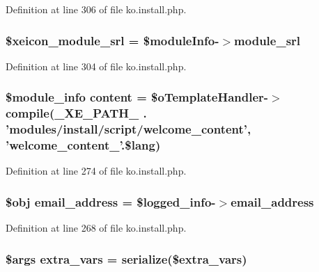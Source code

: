 Definition at line 306 of file ko.\-install.\-php.

\hypertarget{ko_8install_8php_acf278a9931e1d1ea52b045c0fa42b9b3}{
\subsubsection[{\$xeicon\-\_\-module\-\_\-srl}]{\setlength{\rightskip}{0pt plus 5cm}\$xeicon\-\_\-module\-\_\-srl = \$module\-Info-\/$>${\bf module\-\_\-srl}}}\label{ko_8install_8php_acf278a9931e1d1ea52b045c0fa42b9b3}


Definition at line 304 of file ko.\-install.\-php.

\hypertarget{ko_8install_8php_a65dddc3e5e47cb506e6b5417ffb3bdef}{
\subsubsection[{content}]{\setlength{\rightskip}{0pt plus 5cm}\$module\-\_\-info {\bf content} = \$o\-Template\-Handler-\/$>$compile({\bf \-\_\-\-X\-E\-\_\-\-P\-A\-T\-H\-\_\-} . 'modules/{\bf install}/script/welcome\-\_\-content', 'welcome\-\_\-content\-\_\-'.\$lang)}}\label{ko_8install_8php_a65dddc3e5e47cb506e6b5417ffb3bdef}


Definition at line 274 of file ko.\-install.\-php.

\hypertarget{ko_8install_8php_a1dffea0d5ba8194f8ef01f414af0c831}{
\subsubsection[{email\-\_\-address}]{\setlength{\rightskip}{0pt plus 5cm}\$obj email\-\_\-address = \$logged\-\_\-info-\/$>$email\-\_\-address}}\label{ko_8install_8php_a1dffea0d5ba8194f8ef01f414af0c831}


Definition at line 268 of file ko.\-install.\-php.

\hypertarget{ko_8install_8php_ae1dcb37fc34a8f312d2e6abd6f806743}{
\subsubsection[{extra\-\_\-vars}]{\setlength{\rightskip}{0pt plus 5cm}\$args extra\-\_\-vars = serialize(\$extra\-\_\-vars)}}\label{ko_8install_8php_ae1dcb37fc34a8f312d2e6abd6f806743}


